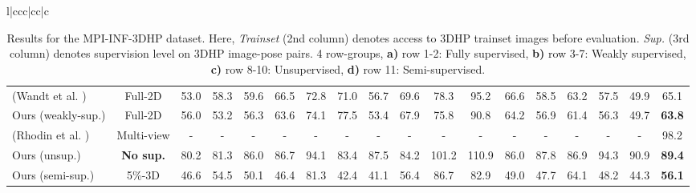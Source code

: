 \documentclass[letterpaper]{article} \usepackage{aaai20}  \usepackage{times}  \usepackage{helvet}  \usepackage{courier}  \usepackage{url}  \usepackage{graphicx}  \usepackage{amsmath}
\begin{document}
\begin{table}[t]
{\begin{tabular}{l|ccc|cc|c}
{{\begin{table*}[htp]
{\begin{tabular}{l|c|ccccccccccccccc|c}
({\color{coolblack}Wandt et al.} \citeyear{wandt2019repnet}) & Full-2D &  53.0 & 58.3 & 59.6 & 66.5 & 72.8 & 71.0 & 56.7 &  69.6 &  78.3 &  95.2 &  66.6 &  58.5 &  63.2 &  57.5 &  49.9 &  65.1 \\
		
		Ours (weakly-sup.) & Full-2D & 56.0 & 53.2 & 56.3 & 63.6 & 74.1 & 77.5 & 53.4 & 67.9 & 75.8 & 90.8 & 64.2 & 56.9 & 61.4 & 56.3 & 49.7 & \textbf{63.8} \\
		
        \hline
        \rowcolor{gray!10}
		({\color{coolblack}Rhodin et al.} \citeyear{rhodin2018unsupervised}) & {Multi-view} & - & - & - & - & - & - & - & - & - & - & - & - & - & - & - & 98.2 \\ 
		
		\rowcolor{gray!10}
		Ours (unsup.) & \textbf{No sup.} & 80.2 & 81.3 & 86.0 & 86.7 & 94.1 & 83.4 & 87.5 & 84.2 & 101.2 & 110.9 & 86.0 & 87.8 & 86.9 & 94.3 & 90.9 & \textbf{89.4} \\ \hline
        
        \rowcolor{gray!25}
		Ours (semi-sup.) & 5\%-3D & 46.6 & 54.5 & 50.1 & 46.4 & 81.3 & 42.4 & 41.1 & 56.4 & 86.7 & 82.9 & 49.0 & 47.7 & 64.1 & 48.2 & 44.3 & \textbf{56.1} \\
\hline
	\end{tabular}}
	\vspace{-4mm}
	\label{tab:protocol2results}
\end{table*} 



\begin{table}[htp]
	\footnotesize
	\caption{ 
	Results for the MPI-INF-3DHP dataset. Here, \textit{Trainset} (2nd column) denotes access to 3DHP trainset images before evaluation. \textit{Sup.} (3rd column) denotes supervision level on 3DHP image-pose pairs. 4 row-groups, \textbf{a)} row 1-2: Fully supervised, \textbf{b)} row 3-7: Weakly supervised, \textbf{c)} row 8-10: Unsupervised, \textbf{d)} row 11: Semi-supervised.
	}
	\centering
	\setlength\tabcolsep{2.0pt}
\end{table}}}
\end{tabular}}
\end{table}
\end{document}
